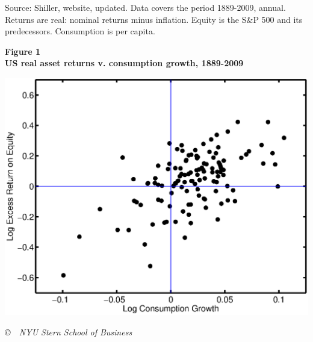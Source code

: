\documentclass[11pt]{article}
\begin{document}
Source:  Shiller, website, updated.
Data covers the period 1889-2009, annual.
Returns are real:  nominal returns minus inflation.
Equity is the S\&P 500 and its predecessors.
Consumption is per capita.

\pagebreak
{\large\bf Figure 1 \\ US real asset returns v. consumption growth, 1889-2009}

\bigskip
\includegraphics[width=\textwidth]{scatter_gxr.eps} \\


\vfill \centerline{\it \copyright \ \number\year \
NYU Stern School of Business}
\end{document}
